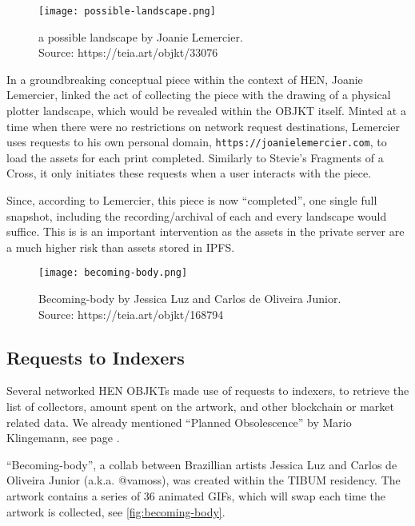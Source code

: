 \begin{figure}[h]
    \centering
    \captionsetup{justification=centering}
    \texttt{[image: possible-landscape.png]}
    \captionsetup{justification=centering}
    \caption[a possible landscape by Joanie Lemercier]{a possible landscape by Joanie Lemercier. \\ Source: https://teia.art/objkt/33076}
    \label{fig:vdp}
\end{figure}

In a groundbreaking conceptual piece within the context of HEN, Joanie Lemercier, linked the act of collecting the piece with the drawing of a physical plotter landscape, which would be revealed within the OBJKT itself. Minted at a time when there were no restrictions on network request destinations, Lemercier uses requests to his own personal domain, \texttt{https://joanielemercier.com}, to load the assets for each print completed. Similarly to Stevie's Fragments of a Cross, it only initiates these requests when a user interacts with the piece.

Since, according to Lemercier, this piece is now ``completed'', one single full snapshot, including the recording/archival of each and every landscape would suffice. This is is an important intervention as the assets in the private server are a much higher risk than assets stored in IPFS.

\begin{figure}[h]
    \centering
    \captionsetup{justification=centering}
    \texttt{[image: becoming-body.png]}
    \captionsetup{justification=centering}
    \caption[Becoming-body by Jessica Luz and Carlos de Oliveira Junior]{Becoming-body by Jessica Luz and Carlos de Oliveira Junior. \\ Source: https://teia.art/objkt/168794}
    \label{fig:becoming-body}
\end{figure}

\subsection{Requests to Indexers}

Several networked HEN OBJKTs made use of requests to indexers, to retrieve the list of collectors, amount spent on the artwork, and other blockchain or market related data.
We already mentioned ``Planned Obsolescence'' by Mario Klingemann, see page \pageref{fig:plannedobsolescence}.

``Becoming-body'', a collab between Brazillian artists Jessica Luz and Carlos de Oliveira Junior (a.k.a. @vamoss), was created within the TIBUM residency. The artwork contains a series of 36 animated GIFs, which will swap each time the artwork is collected, see \autoref{fig:becoming-body}.


